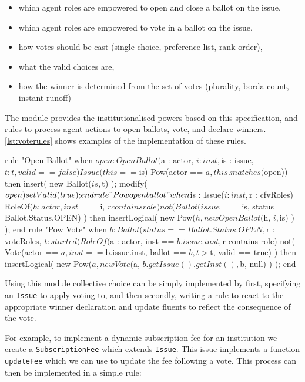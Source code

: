 \begin{itemize}
\item which agent roles are empowered to open and close a ballot on the issue,
\item which agent roles are empowered to vote in a ballot on the issue,
\item how votes should be cast (\eg single choice, preference list, rank order),
\item what the valid choices are,
\item how the winner is determined from the set of votes (\eg plurality, borda count, instant runoff)
\end{itemize}

The module provides the institutionalised powers based on this specification,
and rules to process agent actions to open ballots, vote, and declare winners.
\autoref{lst:voterules} shows examples of the implementation of these rules.

\begin{drools}[label=lst:voterules,caption={Opening of ballots and voting.}]
rule "Open Ballot"
	when
		$open : OpenBallot($a : actor, $i : inst, $is : issue, $t: t, valid == false)
		Issue(this == $is)
		Pow(actor == $a, this.matches($open))
	then
		insert( new Ballot($is, $t) );
		modify($open) {
			setValid(true);
		}
end
rule "Pow open ballot"
	when
		$is : Issue($i : inst, $r : cfvRoles)
		RoleOf($h : actor, inst == $i, $r contains role)
		not( Ballot(issue == $is, status == Ballot.Status.OPEN) )
	then
		insertLogical( new Pow($h, new OpenBallot($h, $i, $is) ) );
end
rule "Pow Vote"
	when
		$b : Ballot(status == Ballot.Status.OPEN, $r : voteRoles, $t : started)
		RoleOf($a : actor, inst == $b.issue.inst, $r contains role)
		not( Vote(actor == $a, inst == $b.issue.inst, ballot == $b, t > $t, valid == true) )
	then
		insertLogical( new Pow($a, new Vote($a, $b.getIssue().getInst(), $b, null) ) );
end
\end{drools}

Using this module collective choice can be simply implemented by first,
specifying an \texttt{Issue} to apply voting to, and then secondly, writing a
rule to react to the appropriate winner declaration and update fluents to
reflect the consequence of the vote.

For example, to implement a dynamic subscription fee for an institution we
create a \texttt{SubscriptionFee} which extends \texttt{Issue}. This issue
implements a function \texttt{updateFee} which we can use to update the fee
following a vote. This process can then be implemented in a simple rule:

